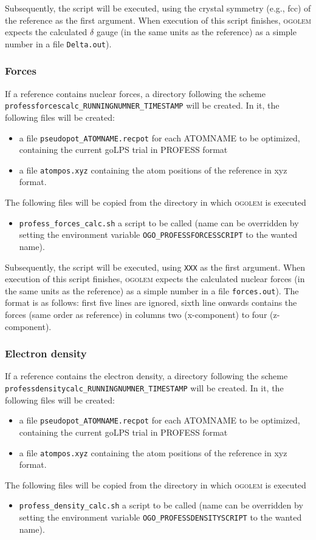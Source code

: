 \documentclass[a4paper,10pt]{scrbook}
\newcommand{\ogo}{\textsc{ogolem}}
\begin{document}
Subsequently, the script will be executed, using the crystal symmetry (e.g., fcc) of the reference as the first argument. When execution of
this script finishes, \ogo{} expects the calculated $\delta$ gauge (in the same units as the reference) as
a simple number in a file \texttt{Delta.out}).

\subsubsection{Forces}
If a reference contains nuclear forces, a directory following the scheme
\texttt{professforcescalc\_RUNNINGNUMNER\_TIMESTAMP} will be created. In it, the following files will be created:
\begin{itemize}
 \item a file \texttt{pseudopot\_ATOMNAME.recpot} for each ATOMNAME to be optimized,
 containing the current goLPS trial in PROFESS format
 \item a file \texttt{atompos.xyz} containing the atom positions of the reference in
 xyz format.
\end{itemize}
The following files will be copied from the directory in which \ogo{} is executed
\begin{itemize}
 \item \texttt{profess\_forces\_calc.sh} a script to be called (name can be overridden
 by setting the environment variable \texttt{OGO\_PROFESSFORCESSCRIPT} to the wanted
 name).
\end{itemize}

Subsequently, the script will be executed, using \texttt{XXX} as the first argument. When execution of
this script finishes, \ogo{} expects the calculated nuclear forces (in the same units as the reference) as
a simple number in a file \texttt{forces.out}). The format is as follows: first five lines are ignored, sixth line
onwards contains the forces (same order as reference) in columns two (x-component) to four (z-component).

\subsubsection{Electron density}
If a reference contains the electron density, a directory following the scheme
\texttt{professdensitycalc\_RUNNINGNUMNER\_TIMESTAMP} will be created. In it, the following files will be created:
\begin{itemize}
 \item a file \texttt{pseudopot\_ATOMNAME.recpot} for each ATOMNAME to be optimized,
 containing the current goLPS trial in PROFESS format
 \item a file \texttt{atompos.xyz} containing the atom positions of the reference in
 xyz format.
\end{itemize}
The following files will be copied from the directory in which \ogo{} is executed
\begin{itemize}
 \item \texttt{profess\_density\_calc.sh} a script to be called (name can be overridden
 by setting the environment variable \texttt{OGO\_PROFESSDENSITYSCRIPT} to the wanted
 name).
\end{itemize}
\end{document}
